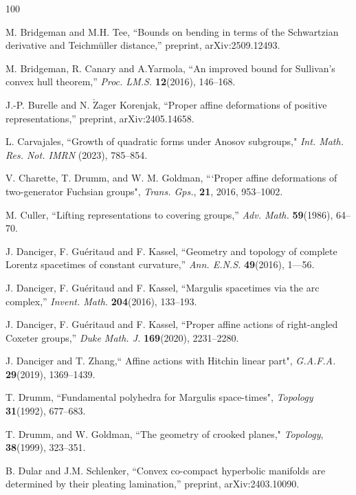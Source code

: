 \documentclass{amsart}
\theoremstyle{plain}
\theoremstyle{definition}
\theoremstyle{remark}
\newcommand{\<}{\left <}
\renewcommand{\>}{\right >}
\begin{document}
\begin{thebibliography}{100}
\begin{scriptsize}
 M. Bridgeman and M.H. Tee, ``Bounds on bending in terms of the Schwartzian derivative and Teichm\"uller distance,'' preprint, arXiv:2509.12493.



 M. Bridgeman, R. Canary and A.Yarmola, ``An improved bound for Sullivan's convex hull theorem,'' 
{\em Proc. LM.S.} {\bf 12}(2016), 146--168.

 J.-P. Burelle and N. $\check{\mathrm{Z}}$ager Korenjak, ``Proper affine deformations of positive representations,'' preprint,
arXiv:2405.14658.


 L. Carvajales, ``Growth of quadratic forms under Anosov subgroups,"  {\em Int. Math. Res. Not. IMRN} (2023), 785--854.

 V. Charette, T. Drumm, and W. M. Goldman, ```Proper affine deformations of two-generator Fuchsian groups", {\em Trans. Gps.}, {\bf  21}, 2016,  953--1002.

 M. Culler, ``Lifting representations to covering groups,'' {\em Adv. Math.} {\bf 59}(1986), 64--70.



 J. Danciger, F. Gu\'eritaud and F. Kassel, ``Geometry and topology of complete Lorentz spacetimes of constant curvature,''
{\em Ann. E.N.S.} {\bf 49}(2016), 1---56.

 J. Danciger, F. Gu\'eritaud and F. Kassel, ``Margulis spacetimes via the arc complex,''
{\em Invent. Math.} {\bf 204}(2016),  133--193.

 J. Danciger, F. Gu\'eritaud and F. Kassel, ``Proper affine actions of right-angled Coxeter groups,''
{\em Duke Math. J.} {\bf 169}(2020), 2231--2280.

 J. Danciger and  T. Zhang,`` Affine actions with Hitchin linear part", {\em G.A.F.A.}  {\bf 29}(2019), 1369--1439.


 T. Drumm,  ``Fundamental polyhedra for Margulis space-times", {\em  Topology} {\bf 31}(1992), 677--683.

 T. Drumm, and W. Goldman, ``The geometry of crooked planes," {\em Topology},  {\bf 38}(1999), 323--351.




 B. Dular and J.M. Schlenker, ``Convex co-compact hyperbolic manifolds are determined by their pleating lamination,''
preprint, arXiv:2403.10090.


\end{scriptsize}
\end{thebibliography}
\end{document}
